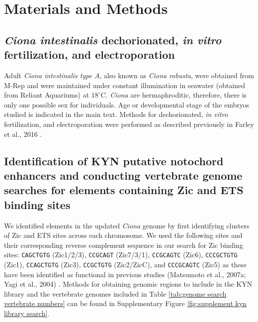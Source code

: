 \section{Materials and Methods}

\subsection{\textit{Ciona intestinalis} dechorionated, \textit{in vitro} fertilization, and electroporation}
Adult \textit{\textit{Ciona} intestinalis type A}, also known as \textit{\textit{Ciona} robusta}, were obtained from M-Rep and were maintained under constant illumination in seawater (obtained from Reliant Aquariums) at $18^\circ$C. \textit{Ciona} are hermaphroditic, therefore, there is only one possible sex for individuals. Age or developmental stage of the embryos studied is indicated in the main text. Methods for dechorionated, \textit{in vitro} fertilization, and electroporation were performed as described previously in Farley et al., 2016 \cite{farley2016}.

\subsection{Identification of KYN putative notochord enhancers and conducting vertebrate genome searches for elements containing Zic and ETS binding sites}
We identified elements in the updated \textit{Ciona} genome by first identifying clusters of Zic and ETS sites across each chromosome. We used the following sites and their corresponding reverse complement sequence in our search for Zic binding sites: \verb|CAGCTGTG| (Zic1/2/3), \verb|CCGCAGT| (Zic7/3/1), \verb|CCGCAGTC| (Zic6), \verb|CCCGCTGTG| (Zic1), \verb|CCAGCTGTG| (Zic3), \verb|CCGCTGTG| (Zic2/ZicC), and \verb|CCCGCAGTC| (Zic5) as these have been identified as functional in previous studies (Matsumoto et al., 2007a; Yagi et al., 2004) \cite{matsumoto2007a,yagi2004}. Methods for obtaining genomic regions to include in the KYN library and the vertebrate genomes included in Table \ref{tab:genome search vertebrate numbers} can be found in Supplementary Figure \ref{fig:supplement kyn library search}.

